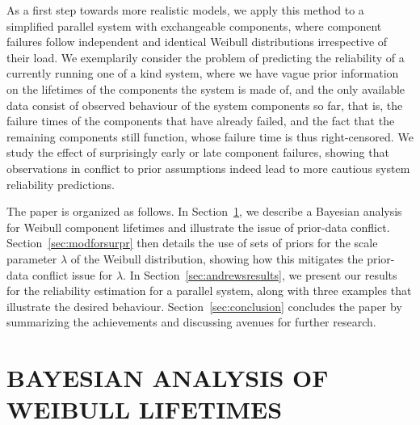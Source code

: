 \documentclass[12pt,a4paper,twocolumn,fleqn]{narms}
\begin{document}
As a first step towards more realistic models, we apply this method
to a simplified parallel system with exchangeable components,
where component failures follow independent and identical Weibull distributions irrespective of their load.
We exemplarily consider the problem of predicting the reliability of a currently running one of a kind system,
where we have vague prior information on the lifetimes of the components the system is made of,
and the only available data consist of observed behaviour of the system components so far,
that is, the failure times of the components that have already failed,
and the fact that the remaining components still function,
whose failure time is thus right-censored.
We study the effect of surprisingly early or late component failures,
showing that observations in conflict to prior assumptions
indeed lead to more cautious system reliability predictions.

The paper is organized as follows.
In Section~\ref{sec:weibull}, we describe a Bayesian analysis for Weibull component lifetimes
and illustrate the issue of prior-data conflict.
Section~\ref{sec:modforsurpr} then details the use of sets of priors
for the scale parameter $\lambda$ of the Weibull distribution,
showing how this mitigates the prior-data conflict issue for $\lambda$.
In Section~\ref{sec:andrewsresults}, we present our results for the reliability estimation for a parallel system,
along with three examples that illustrate the desired behaviour.
Section~\ref{sec:conclusion} concludes the paper by summarizing the achievements and discussing avenues for further research.


\section{BAYESIAN ANALYSIS OF WEIBULL LIFETIMES}
\label{sec:weibull}
\end{document}
